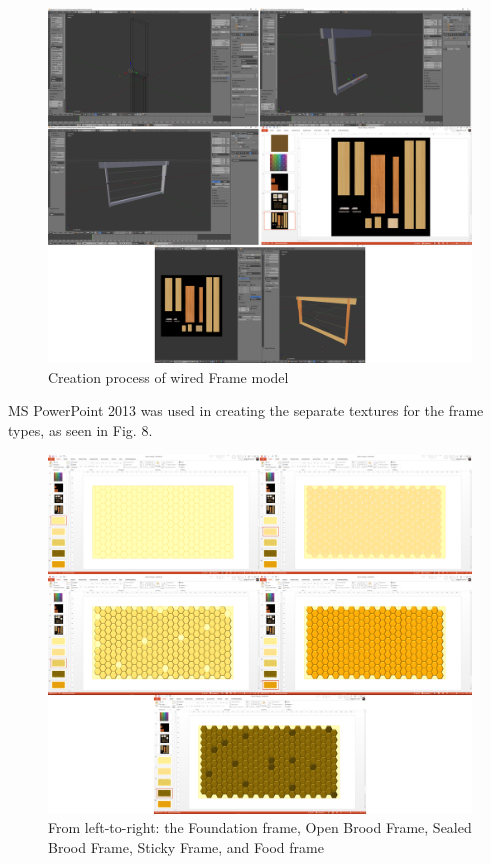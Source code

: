 \documentclass[journal]{./IEEE/IEEEtran}
\begin{document}
\begin{figure}[H]
\includegraphics[scale=0.265]{./images/wired-frame-model.png}
\centering
\caption{Creation process of wired Frame model}
\centering
\end{figure}
\indent MS PowerPoint 2013 was used in creating the separate textures for the frame types, as seen in Fig. 8.
\begin{figure}[H]
\includegraphics[scale=0.25]{./images/frame-type-textures.png}
\centering
\caption{From left-to-right: the Foundation frame, Open Brood Frame, Sealed Brood Frame, Sticky Frame, and Food frame}
\centering
\end{figure}
\end{document}
